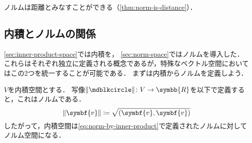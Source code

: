 \documentclass[../sotsu.tex]{subfiles}
\begin{document}
ノルムは距離とみなすことができる（\cref{thm:norm-is-distance}）．


\subsection{内積とノルムの関係}

\cref{sec:inner-product-space}では内積を，
\cref{sec:norm-space}ではノルムを導入した．
これらはそれぞれ独立に定義される概念であるが，特殊なベクトル空間においてはこの2つを統一することが可能である．
まずは内積からノルムを定義しよう．

\begin{definition}[内積から導かれるノルム]
    \label{dfn:norm-by-inner-product}
    $V$を内積空間とする．
    写像$\norm{\bigdot} \colon V \to \symbb{R}$を以下で定義すると，これはノルムである．
    \begin{equation}
        \label{eq:norm-by-inner-product}
        \norm{\symbf{v}} \coloneq \sqrt{(\symbf{v}, \symbf{v})}
    \end{equation}
    したがって，内積空間は\cref{eq:norm-by-inner-product}で定義されたノルムに対してノルム空間になる．
\end{definition}
\end{document}
